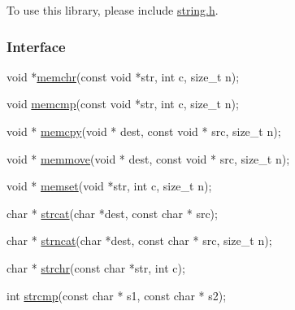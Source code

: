 To use this library, please include {\ttfamily \mbox{\hyperlink{a00131}{string.\+h}}}.

\subsubsection*{Interface}


\begin{DoxyCode}
\textcolor{keywordtype}{void} *\mbox{\hyperlink{a00128_af2c756015b1cb92274fc019a175ae8bb}{memchr}}(\textcolor{keyword}{const} \textcolor{keywordtype}{void} *str, \textcolor{keywordtype}{int} c, \textcolor{keywordtype}{size\_t} n);

\textcolor{keywordtype}{void} \mbox{\hyperlink{a00128_ace6c4869ab3af01c6f27eac47773917a}{memcmp}}(\textcolor{keyword}{const} \textcolor{keywordtype}{void} *str, \textcolor{keywordtype}{int} c, \textcolor{keywordtype}{size\_t} n);

\textcolor{keywordtype}{void} * \mbox{\hyperlink{a00128_a14938524dcbeb59d7117ba5e151ad1b1}{memcpy}}(\textcolor{keywordtype}{void} * dest, \textcolor{keyword}{const} \textcolor{keywordtype}{void} * src, \textcolor{keywordtype}{size\_t} n);

\textcolor{keywordtype}{void} * \mbox{\hyperlink{a00128_a802c986820d3866639922b6bc9484f90}{memmove}}(\textcolor{keywordtype}{void} * dest, \textcolor{keyword}{const} \textcolor{keywordtype}{void} * src, \textcolor{keywordtype}{size\_t} n);

\textcolor{keywordtype}{void} * \mbox{\hyperlink{a00128_a48a16bf628904bdd1b28cbaedf934868}{memset}}(\textcolor{keywordtype}{void} *str, \textcolor{keywordtype}{int} c, \textcolor{keywordtype}{size\_t} n);

\textcolor{keywordtype}{char} * \mbox{\hyperlink{a00128_adb8723e585ed29f2370cddf90f6891bc}{strcat}}(\textcolor{keywordtype}{char} *dest, \textcolor{keyword}{const} \textcolor{keywordtype}{char} * src);

\textcolor{keywordtype}{char} * \mbox{\hyperlink{a00128_a0aee928c2844a269966e4832fd2255c5}{strncat}}(\textcolor{keywordtype}{char} *dest, \textcolor{keyword}{const} \textcolor{keywordtype}{char} * src, \textcolor{keywordtype}{size\_t} n);

\textcolor{keywordtype}{char} * \mbox{\hyperlink{a00128_afcd97f487174f9092b0f23c7ac78a55a}{strchr}}(\textcolor{keyword}{const} \textcolor{keywordtype}{char} *str, \textcolor{keywordtype}{int} c);

\textcolor{keywordtype}{int} \mbox{\hyperlink{a00128_a11bd144d7d44914099a3aeddf1c8567d}{strcmp}}(\textcolor{keyword}{const} \textcolor{keywordtype}{char} * s1, \textcolor{keyword}{const} \textcolor{keywordtype}{char} * s2);


\end{DoxyCode}
